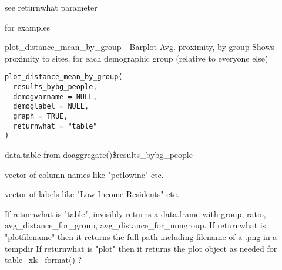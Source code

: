\documentclass[a4paper]{book}
\begin{document}
%
\begin{Value}
see returnwhat parameter
\end{Value}
%
\begin{SeeAlso}\relax
{}  for examples
\end{SeeAlso}
%
\begin{Examples}
\end{Examples}
%
\begin{Description}\relax
plot\_distance\_mean\_by\_group - Barplot Avg. proximity, by group
Shows proximity to sites, for each demographic group (relative to everyone else)
\end{Description}
%
\begin{Usage}
\begin{verbatim}
plot_distance_mean_by_group(
  results_bybg_people,
  demogvarname = NULL,
  demoglabel = NULL,
  graph = TRUE,
  returnwhat = "table"
)
\end{verbatim}
\end{Usage}
%
\begin{Arguments}
\begin{ldescription}
\item[\code{results\_bybg\_people}] data.table from doaggregate()\$results\_bybg\_people

\item[\code{demogvarname}] vector of column names like "pctlowinc" etc.

\item[\code{demoglabel}] vector of labels like "Low Income Residents" etc.

\item[\code{returnwhat}] If returnwhat is "table", invisibly returns a
data.frame with group, ratio, avg\_distance\_for\_group, avg\_distance\_for\_nongroup.
If returnwhat is "plotfilename" then it returns the full path including filename of a .png in a tempdir
If returnwhat is "plot" then it returns the plot object as needed for table\_xls\_format() ?
\end{ldescription}
\end{Arguments}
\end{document}
